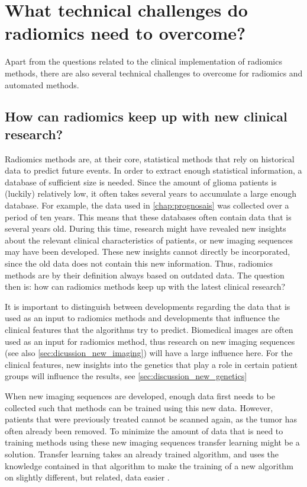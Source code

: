\section{What technical challenges do radiomics need to overcome?}\label{sec:discussion_technical}
Apart from the questions related to the clinical implementation of radiomics methods, there are also several technical challenges to overcome for radiomics and automated methods.

\subsection{How can radiomics keep up with new clinical research?}
Radiomics methods are, at their core, statistical methods that rely on historical data to predict future events.
In order to extract enough statistical information, a database of sufficient size is needed.
Since the amount of glioma patients is (luckily) relatively low, it often takes several years to accumulate a large enough database.
For example, the data used in \cref{chap:prognosais} was collected over a period of ten years.
This means that these databases often contain data that is several years old.
During this time, research might have revealed new insights about the relevant clinical characteristics of patients, or new imaging sequences may have been developed.
These new insights cannot directly be incorporated, since the old data does not contain this new information.
Thus, radiomics methods are by their definition always based on outdated data.
The question then is: how can radiomics methods keep up with the latest clinical research?

It is important to distinguish between developments regarding the data that is used as an input to radiomics methods and developments that influence the clinical features that the algorithms try to predict.
Biomedical images are often used as an input for radiomics method, thus research on new imaging sequences (see also \cref{sec:dicussion_new_imaging}) will have a large influence here.
For the clinical features, new insights into the genetics that play a role in certain patient groups will influence the results, see \cref{sec:discussion_new_genetics}

When new imaging sequences are developed, enough data first needs to be collected such that methods can be trained using this new data.
However, patients that were previously treated cannot be scanned again, as the \gls{tumor} has often already been removed.
To minimize the amount of data that is need to training methods using these new imaging sequences transfer learning might be a solution.
Transfer learning takes an already trained algorithm, and uses the knowledge contained in that algorithm to make the training of a new algorithm on slightly different, but related, data easier \autocite{shin2016transfer}.

